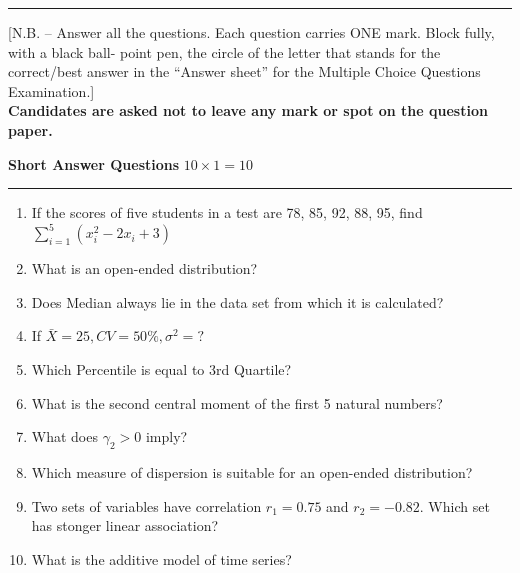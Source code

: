 \documentclass[12pt]{exam}
\begin{document}
\hrule

\begin{center}
[N.B. – Answer all the questions. Each question carries ONE mark. Block fully, with a black ball- point pen, the circle of the letter that stands for the correct/best answer in the “Answer sheet” for the Multiple Choice Questions Examination.]\\

  
  \textbf{Candidates are asked not to leave any mark or spot on the question paper.}
\end{center}

\textbf{Short Answer Questions} \hfill $10 \times 1 =10$
\hrule
\begin{enumerate}
  \item If the scores of five students in a test are 78, 85, 92, 88, 95, 
find $\displaystyle \sum_{i=1}^5 (x_i^2 - 2x_i + 3)$  \underline{\hspace{3cm}}
  \item What is an open-ended distribution?  \underline{\hspace{3cm}}
  \item Does Median always lie in the data set from which it is calculated?  \underline{\hspace{3cm}}
  \item If $\bar X = 25, CV = 50\%, \sigma^2=?$  \underline{\hspace{3cm}}
  \item Which Percentile is equal to 3rd Quartile?  \underline{\hspace{3cm}}
  \item  What is the second central moment of the first 5 natural numbers?  \underline{\hspace{3cm}}
  \item What does $\gamma_2>0$ imply?  \underline{\hspace{3cm}}
  \item Which measure of dispersion is suitable for an open-ended distribution?       \underline{\hspace{3cm}}
   \item Two sets of variables have correlation $r_1 = 0.75$ and $r_2 = -0.82$. Which set has stonger linear association?  \underline{\hspace{3cm}}
   \item What is the additive model of time series?   \underline{\hspace{3cm}}
\end{enumerate}
\end{document}
